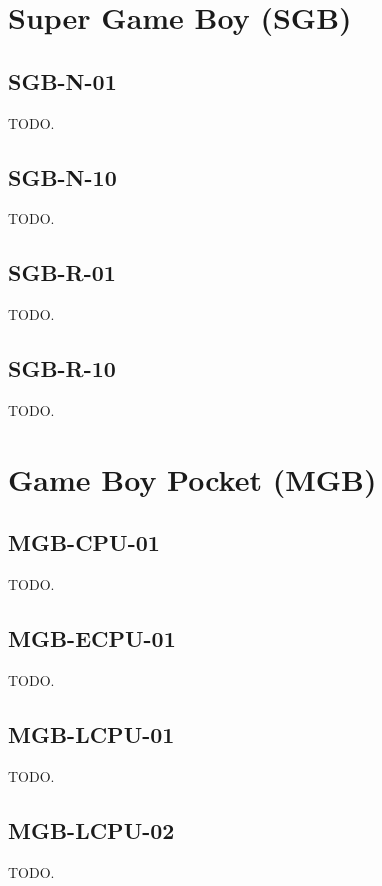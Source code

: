 \section{Super Game Boy (SGB)}

\subsection{SGB-N-01}

TODO.

\subsection{SGB-N-10}

TODO.

\subsection{SGB-R-01}

TODO.

\subsection{SGB-R-10}

TODO.

\section{Game Boy Pocket (MGB)}

\subsection{MGB-CPU-01}

TODO.

\subsection{MGB-ECPU-01}

TODO.

\subsection{MGB-LCPU-01}

TODO.

\subsection{MGB-LCPU-02}

TODO.


